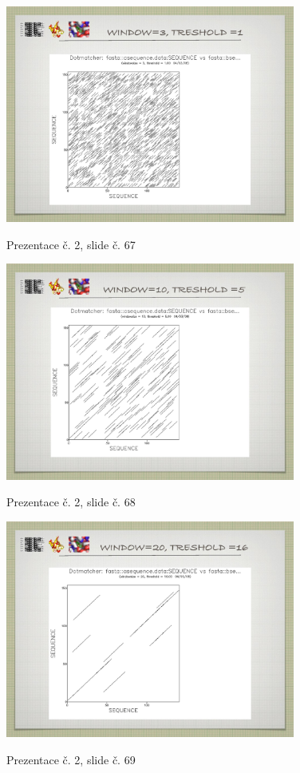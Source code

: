 \documentclass[DIV=8]{scrreprt}
\begin{document}
\begin{figure}
    \caption{Prezentace č. 2, slide č. 67}
    \includegraphics[width=0.85\textwidth]{slides-2/slide-67.jpg}
    \centering
    \label{slides-2-slide-67}
\end{figure}
\begin{figure}
    \caption{Prezentace č. 2, slide č. 68}
    \includegraphics[width=0.85\textwidth]{slides-2/slide-68.jpg}
    \centering
    \label{slides-2-slide-68}
\end{figure}
\begin{figure}
    \caption{Prezentace č. 2, slide č. 69}
    \includegraphics[width=0.85\textwidth]{slides-2/slide-69.jpg}
    \centering
    \label{slides-2-slide-69}
\end{figure}
\end{document}
